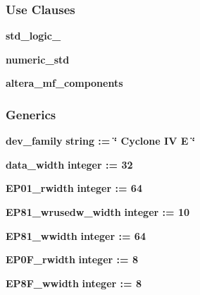 \subsubsection*{Use Clauses}
 \begin{DoxyCompactItemize}
\item 
{\bf std\+\_\+logic\+\_}   
\item 
{\bf numeric\+\_\+std}   
\item 
{\bf altera\+\_\+mf\+\_\+components}   
\end{DoxyCompactItemize}
\subsubsection*{Generics}
 \begin{DoxyCompactItemize}
\item 
{\bf dev\+\_\+family} {\bfseries {\bfseries \textcolor{comment}{string}\textcolor{vhdlchar}{ }\textcolor{vhdlchar}{ }\textcolor{vhdlchar}{\+:}\textcolor{vhdlchar}{=}\textcolor{vhdlchar}{ }\textcolor{vhdlchar}{ }\textcolor{vhdlchar}{ }\textcolor{vhdlchar}{ }\textcolor{keyword}{\char`\"{} Cyclone I\+V E \char`\"{}}\textcolor{vhdlchar}{ }}}
\item 
{\bf data\+\_\+width} {\bfseries {\bfseries \textcolor{comment}{integer}\textcolor{vhdlchar}{ }\textcolor{vhdlchar}{ }\textcolor{vhdlchar}{\+:}\textcolor{vhdlchar}{=}\textcolor{vhdlchar}{ }\textcolor{vhdlchar}{ } \textcolor{vhdldigit}{32} \textcolor{vhdlchar}{ }}}
\item 
{\bf E\+P01\+\_\+rwidth} {\bfseries {\bfseries \textcolor{comment}{integer}\textcolor{vhdlchar}{ }\textcolor{vhdlchar}{ }\textcolor{vhdlchar}{\+:}\textcolor{vhdlchar}{=}\textcolor{vhdlchar}{ }\textcolor{vhdlchar}{ } \textcolor{vhdldigit}{64} \textcolor{vhdlchar}{ }}}
\item 
{\bf E\+P81\+\_\+wrusedw\+\_\+width} {\bfseries {\bfseries \textcolor{comment}{integer}\textcolor{vhdlchar}{ }\textcolor{vhdlchar}{ }\textcolor{vhdlchar}{\+:}\textcolor{vhdlchar}{=}\textcolor{vhdlchar}{ }\textcolor{vhdlchar}{ } \textcolor{vhdldigit}{10} \textcolor{vhdlchar}{ }}}
\item 
{\bf E\+P81\+\_\+wwidth} {\bfseries {\bfseries \textcolor{comment}{integer}\textcolor{vhdlchar}{ }\textcolor{vhdlchar}{ }\textcolor{vhdlchar}{\+:}\textcolor{vhdlchar}{=}\textcolor{vhdlchar}{ }\textcolor{vhdlchar}{ } \textcolor{vhdldigit}{64} \textcolor{vhdlchar}{ }}}
\item 
{\bf E\+P0\+F\+\_\+rwidth} {\bfseries {\bfseries \textcolor{comment}{integer}\textcolor{vhdlchar}{ }\textcolor{vhdlchar}{ }\textcolor{vhdlchar}{\+:}\textcolor{vhdlchar}{=}\textcolor{vhdlchar}{ }\textcolor{vhdlchar}{ } \textcolor{vhdldigit}{8} \textcolor{vhdlchar}{ }}}
\item 
{\bf E\+P8\+F\+\_\+wwidth} {\bfseries {\bfseries \textcolor{comment}{integer}\textcolor{vhdlchar}{ }\textcolor{vhdlchar}{ }\textcolor{vhdlchar}{\+:}\textcolor{vhdlchar}{=}\textcolor{vhdlchar}{ }\textcolor{vhdlchar}{ } \textcolor{vhdldigit}{8} \textcolor{vhdlchar}{ }}}
\end{DoxyCompactItemize}
